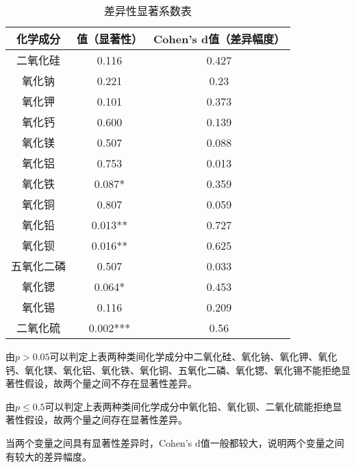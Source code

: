 \begin{table}[H]
	\centering
	\begin{tabular}{c c c} 
		\toprule[1.5pt]
		化学成分 & 值（显著性） & Cohen's d值（差异幅度） \\
		\midrule[1pt]
		二氧化硅 & 0.116 & 0.427 \\
		氧化钠 & 0.221 & 0.23 \\
		氧化钾 & 0.101 & 0.373 \\
		氧化钙 & 0.600 & 0.139 \\
		氧化镁 & 0.507 & 0.088 \\
		氧化铝 & 0.753 & 0.013 \\
		氧化铁 & 0.087* & 0.359 \\
		氧化铜 & 0.807 & 0.059 \\
		氧化铅 & 0.013** & 0.727 \\
		氧化钡	& 0.016** &	0.625 \\
		五氧化二磷 & 0.507 & 0.033 \\
		氧化锶 & 0.064* & 0.453 \\
		氧化锡 & 0.116 & 0.209 \\
		二氧化硫 & 0.002*** & 0.56 \\
		\toprule[1.5pt]
\end{tabular}
\caption{差异性显著系数表}
\end{table}

由$p>0.05$可以判定上表两种类间化学成分中二氧化硅、氧化钠、氧化钾、氧化钙、氧化镁、氧化铝、氧化铁、氧化铜、五氧化二磷、氧化锶、氧化锡不能拒绝显著性假设，故两个量之间不存在显著性差异。

由$p\leq 0.5$可以判定上表两种类间化学成分中氧化铅、氧化钡、二氧化硫能拒绝显著性假设，故两个量之间存在显著性差异。

当两个变量之间具有显著性差异时，Cohen's d值一般都较大，说明两个变量之间有较大的差异幅度。
